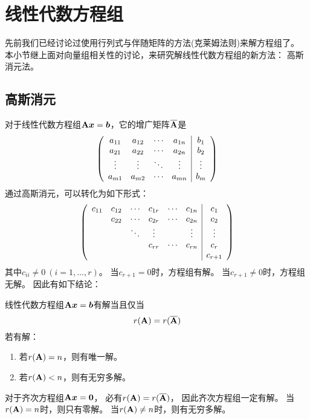 \section{线性代数方程组}
先前我们已经讨论过使用行列式与伴随矩阵的方法(克莱姆法则)来解方程组了。
本小节继上面对向量组相关性的讨论，来研究解线性代数方程组的新方法：
高斯消元法。

\subsection{高斯消元}
对于线性代数方程组$\mmA\mvx=\mvb$，它的增广矩阵$\overline{\mmA}$是
\begin{displaymath}
  \mmat{cccc|c}{
    a_{11} & a_{12} & \cdots & a_{1n} & b_1 \\
    a_{21} & a_{22} & \cdots & a_{2n} & b_2 \\
    \vdots & \vdots & \ddots & \vdots & \vdots \\
    a_{m1} & a_{m2} & \cdots & a_{mn} & b_m
  }
\end{displaymath}
通过高斯消元，可以转化为如下形式：
\begin{equation} \label{eq:gauss-elim}
  \mmat{cccccc|c}{
    c_{11} & c_{12} & \cdots & c_{1r} & \cdots & c_{1n} & c_1    \\
           & c_{22} & \cdots & c_{2r} & \cdots & c_{2n} & c_2    \\
           &        & \ddots & \vdots &        & \vdots & \vdots \\
           &        &        & c_{rr} & \cdots & c_{rn} & c_r    \\
           &        &        &        &        &        & c_{r+1}
  }
\end{equation}
其中$c_{ii}\neq 0\ (i=1,\dots,r)$。
当$c_{r+1}=0$时，方程组有解。
当$c_{r+1}\neq 0$时，方程组无解。
因此有如下结论：

\begin{theorem}[线性代数方程组有解的充要条件]
  线性代数方程组$\mmA\mvx=\mvb$有解当且仅当
  \[ r(\mmA) = r(\overline{\mmA}) \]
  若有解：
  \begin{enumerate}
    \item 若$r(\mmA)=n$，则有唯一解。
    \item 若$r(\mmA) < n$，则有无穷多解。
  \end{enumerate}
\end{theorem}

\begin{remark}
  对于齐次方程组$\mmA\mvx=\mvZero$，
  必有$r(\mmA)=r(\overline{\mmA})$，
  因此齐次方程组一定有解。
  当$r(\mmA)=n$时，则只有零解。
  当$r(\mmA)\neq n$时，则有无穷多解。
\end{remark}

